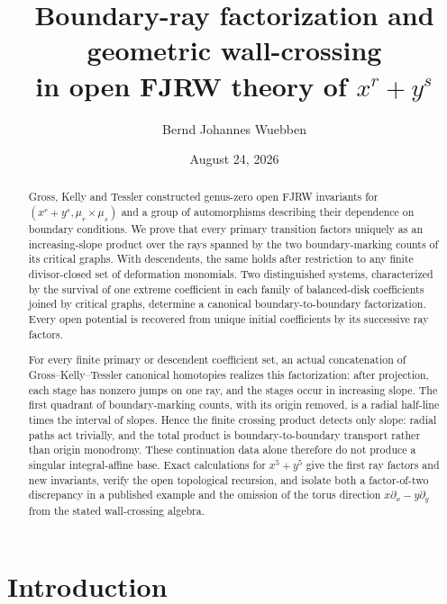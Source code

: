 \documentclass[11pt]{amsart}
\title[Boundary-ray factorization in open FJRW theory]{Boundary-ray
factorization and geometric wall-crossing\\ in open FJRW theory of
$x^{r}+y^{s}$}
\author{Bernd Johannes Wuebben}
\date{August 24, 2026}
\theoremstyle{definition}
\theoremstyle{remark}
\begin{document}
\begin{abstract}
Gross, Kelly and Tessler constructed genus-zero open FJRW invariants for
$(x^r+y^s,\mu_r\times\mu_s)$ and a group of automorphisms describing their
dependence on boundary conditions.  We prove that every primary transition
factors uniquely as an increasing-slope product over the rays spanned by the
two boundary-marking counts of its critical graphs.  With descendents, the
same holds after restriction to any finite divisor-closed set of deformation
monomials.  Two distinguished systems, characterized by the survival of one
extreme coefficient in each family of balanced-disk coefficients joined by
critical graphs, determine a canonical boundary-to-boundary factorization.
Every open potential is recovered from unique initial coefficients by its
successive ray factors.

For every finite primary or descendent coefficient set, an actual
concatenation of Gross--Kelly--Tessler canonical homotopies realizes this
factorization: after projection, each stage has nonzero jumps on one ray, and
the stages occur in increasing slope.  The first quadrant of boundary-marking
counts, with its origin removed, is a radial half-line times the interval of
slopes.  Hence the finite crossing product detects only slope: radial paths act
trivially, and the total product is boundary-to-boundary transport rather than
origin monodromy.  These continuation data alone therefore do not produce a
singular integral-affine base.  Exact calculations for $x^5+y^5$ give the
first ray factors and new invariants, verify the open topological recursion,
and isolate both a factor-of-two discrepancy in a published example and the
omission of the torus direction $x\partial_x-y\partial_y$ from the stated
wall-crossing algebra.
\end{abstract}

\maketitle
\enlargethispage{3pt}

\section{Introduction}
\label{sec:intro}
\end{document}
